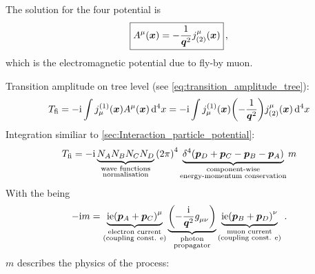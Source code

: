 The solution for the four potential is
\begin{align}
    \boxed{A^\mu \qty({\bm{x}}) = - \frac{1}{{\bm{q}}^2} j_{(2)}^\mu \qty({\bm{x}})}\,,
\end{align}
which is the electromagnetic potential due to fly-by muon.

Transition amplitude on tree level (see \cref{eq:transition_amplitude_tree}):
\begin{align}
    T_{\mathrm{fi}} = -\mathrm{i} \int j_\mu^{(1)} \qty({\bm{x}}) A^\mu \qty({\bm{x}}) \dd[4]{x} = -\mathrm{i} \int j_\mu^{(1)} \qty({\bm{x}}) \qty(-\frac{1}{{\bm{q}}^2}) j_{(2)}^\mu \qty({\bm{x}}) \dd[4]{x}
\end{align}
Integration similiar to \cref{sec:Interaction_particle_potential}:
\begin{align}
    T_{\mathrm{fi}} = - \mathrm{i} \underbrace{N_A N_B N_C N_D}_{\substack{\text{wave functions} \\ \text{normalisation}}} \qty(2\pi)^4 \underbrace{\delta^4 \qty({\bm{p}}_D + {\bm{p}}_C - {\bm{p}}_B - {\bm{p}}_A)}_{\substack{\text{component-wise}\\ \text{energy-momentum conservation}}} m
\end{align}
With the  being
\begin{align}
    -\ti m = \underbrace{\ti \mr{e} \qty(\fvec p_A + \fvec p_C)^\mu}_{\substack{\text{electron current} \\ \text{(coupling const. $\mr e$)}}} \underbrace{\qty(- \frac{\ti}{\fvec q^2} \tensor{g}{_\mu_\nu})}_{\substack{\text{photon} \\ \text{propagator}}} \underbrace{\ti \mr e \qty(\fvec p_B + \fvec p_D)^\nu}_{\substack{\text{muon current} \\ \text{(coupling const. $\mr e$)}}} \,.
\end{align}
$m$ describes the physics of the process:
